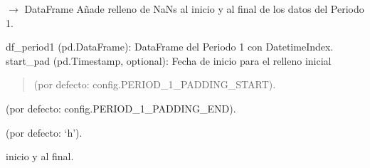 \documentclass[letterpaper,10pt,english]{sphinxmanual}
\begin{document}
\begin{fulllineitems}
\label{\detokenize{pampaneira_imputation:pampaneira_imputation.data_preprocessor.add_period1_padding}}
\pysigstartsignatures
\pysiglinewithargsret
{}
{\sphinxparamcomma {}\sphinxparamcomma {}\sphinxparamcomma {}}
{{ $\rightarrow$ DataFrame}}
\pysigstopsignatures
\sphinxAtStartPar
Añade relleno de NaNs al inicio y al final de los datos del Periodo 1.
\begin{description}
\sphinxAtStartPar
df\_period1 (pd.DataFrame): DataFrame del Periodo 1 con DatetimeIndex.
start\_pad (pd.Timestamp, optional): Fecha de inicio para el relleno inicial
\begin{quote}

\sphinxAtStartPar
(por defecto: config.PERIOD\_1\_PADDING\_START).
\end{quote}
\begin{description}
\sphinxAtStartPar
(por defecto: config.PERIOD\_1\_PADDING\_END).

\sphinxAtStartPar
(por defecto: ‘h’).

\end{description}

\begin{description}
\sphinxAtStartPar
inicio y al final.

\end{description}

\end{description}

\end{fulllineitems}
\end{document}
